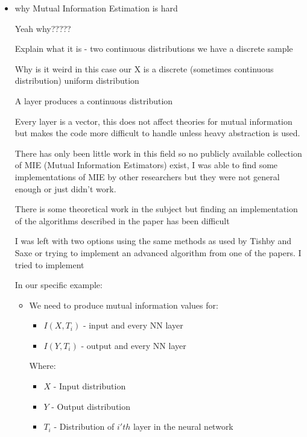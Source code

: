 \begin{itemize}
  \item{
      why Mutual Information Estimation is hard

      Yeah why?????

      Explain what it is - two continuous distributions we have a discrete
      sample 

      Why is it weird in this case
      our X is a discrete (sometimes continuous distribution) uniform
      distribution 

      A layer produces a continuous distribution

      Every layer is a vector, this does not affect theories for mutual
      information but makes the code more difficult to handle unless heavy
      abstraction is used.

      There has only been little work in this field so no publicly available
      collection of MIE (Mutual Information Estimators) exist, I was able to
      find some implementations of MIE by other researchers but they were not
      general enough or just didn't work. 

      There is some theoretical work in the subject but finding an
      implementation of the algorithms described in the paper has been difficult

      I was left with two options using the same methods as used by Tishby and
      Saxe or trying to implement an advanced algorithm from one of the papers.
      I tried to implement 

      In our specific example:
      \begin{itemize}
        \item{
            We need to produce mutual information values for:
            \begin{itemize}
              \item{
                  $I(X, T_i)$ - input and every NN layer
                }
              \item{
                  $I(Y, T_i)$ - output and every NN layer
                }
            \end{itemize}

            Where:

            \begin{itemize}
              \item{
                  $X$ - Input distribution
                }
              \item{
                  $Y$ - Output distribution
                }
              \item{
                  $T_i$ - Distribution of $i'th$ layer in the neural network
                }
            \end{itemize}

}
\end{itemize}}
\end{itemize}
